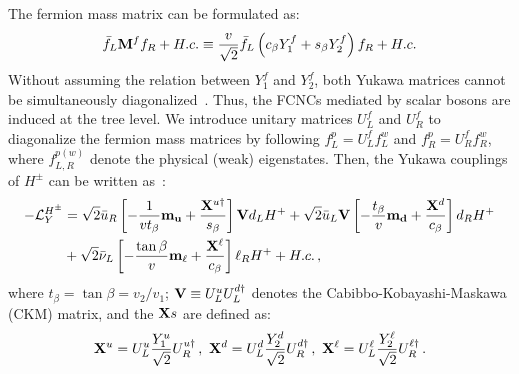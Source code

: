 \documentclass[prd,preprint,superscriptaddress,amsmath,amssymb]{revtex4}
\begin{document}
The fermion mass matrix can be formulated as:
 \begin{equation}
  \bar f_L {\bf M}^f f_R + H.c. \equiv  \frac{v}{\sqrt{2}}\bar f_L \left( c_\beta Y^f_1 + s_\beta Y^f_2 \right) f_R + H.c. 
 \end{equation}
Without assuming the relation between $Y^f_1$ and $Y^f_2$, both Yukawa matrices cannot be simultaneously diagonalized~\cite{Ahn:2010zza}. Thus, the FCNCs mediated by scalar bosons are induced at the tree level. We introduce unitary matrices $U^f_L$ and $U^f_R$  to diagonalize the fermion mass matrices by following $f^p_L = U^f_L f^w_L$ and  $f^p_R = U^f_R f^w_R$, where $f^{p(w)}_{L,R}$ denote the physical (weak) eigenstates. Then, the Yukawa couplings of  $H^\pm$  can be written as~\cite{Benbrik:2015evd}:
%
\begin{align}
-{\cal L}^{H^\pm}_Y &=  \sqrt{2} \bar u_R  \left[ - \frac{ 1}{v t_\beta } {\bf m_u} + \frac{{\bf X}^{u\dagger}}{ s_\beta}  \right] {\bf V} d_L H^+ + \sqrt{2} \bar u_L {\bf V} \left[ - \frac{t_\beta }{v } {\bf m_d} + \frac{{\bf X}^d}{  c_\beta}  \right] d_R H^+  \nonumber \\
%
&+\sqrt{2} \bar \nu_L \left[ -\frac{\tan\beta}{v } {\bf m_\ell} + \frac{{\bf X}^\ell }{ c_\beta}  \right] \ell_R H^+ + H.c.\,, \label{eq:YuCH}
\end{align}
where $t_\beta=\tan\beta=v_2/v_1$; ${\bf V}\equiv U^u_L U^{d\dagger}_L$ denotes the Cabibbo-Kobayashi-Maskawa (CKM) matrix, and the ${\bf X}s$ are defined as: %
 \begin{equation}
  {\bf X}^u= U^u_L \frac{Y^u_1}{\sqrt{2}}  U^{u\dagger}_R \,, \     {\bf X}^d= U^d_L \frac{Y^d_2}{\sqrt{2}} U^{d\dagger}_R \,, \ 
{\bf X}^\ell= U^\ell_L \frac{Y^\ell_2}{\sqrt{2}} U^{\ell\dagger}_R\,. \label{eq:Xs}
 \end{equation}
\end{document}
